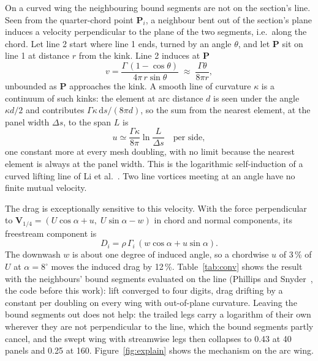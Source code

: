 \documentclass[11pt,a4paper]{article}
\begin{document}
On a curved wing the neighbouring bound segments are not on the section's line. Seen from the quarter-chord point $\mathbf P_i$, a neighbour bent out of the section's plane induces a velocity perpendicular to the plane of the two segments, i.e.\ along the chord. Let line 2 start where line 1 ends, turned by an angle $\theta$, and let $\mathbf P$ sit on line 1 at distance $r$ from the kink. Line 2 induces at $\mathbf P$
\begin{equation}
v=\frac{\Gamma\,(1-\cos\theta)}{4\pi\, r\sin\theta}\;\approx\;\frac{\Gamma\theta}{8\pi r},
\label{eq:kink}
\end{equation}
unbounded as $\mathbf P$ approaches the kink. A smooth line of curvature $\kappa$ is a continuum of such kinks: the element at arc distance $d$ is seen under the angle $\kappa d/2$ and contributes $\Gamma\kappa\,\mathrm{d}s/(8\pi d)$, so the sum from the nearest element, at the panel width $\Delta s$, to the span $L$ is
\begin{equation}
u\simeq\frac{\Gamma\kappa}{8\pi}\ln\frac{L}{\Delta s}\quad\text{per side},
\label{eq:log}
\end{equation}
one constant more at every mesh doubling, with no limit because the nearest element is always at the panel width. This is the logarithmic self-induction of a curved lifting line of Li et al.~\cite{li2020}. Two line vortices meeting at an angle have no finite mutual velocity.

The drag is exceptionally sensitive to this velocity. With the force perpendicular to $\mathbf V_{1/4}=(U\cos\alpha+u,\;U\sin\alpha-w)$ in chord and normal components, its freestream component is
\begin{equation}
D_i=\rho\,\Gamma_i\,(w\cos\alpha+u\sin\alpha).
\label{eq:drag}
\end{equation}
The downwash $w$ is about one degree of induced angle, so a chordwise $u$ of 3\,\% of $U$ at $\alpha=8^\circ$ moves the induced drag by 12\,\%. Table~\ref{tab:conv} shows the result with the neighbours' bound segments evaluated on the line (Phillips and Snyder~\cite{phillips2000}, the code before this work): lift converged to four digits, drag drifting by a constant per doubling on every wing with out-of-plane curvature. Leaving the bound segments out does not help: the trailed legs carry a logarithm of their own wherever they are not perpendicular to the line, which the bound segments partly cancel, and the swept wing with streamwise legs then collapses to 0.43 at 40 panels and 0.25 at 160. Figure~\ref{fig:explain} shows the mechanism on the arc wing.
\end{document}
